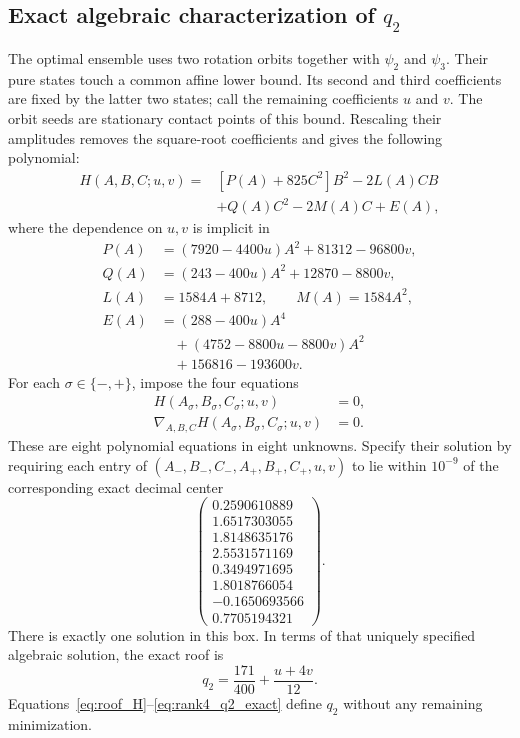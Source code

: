 \documentclass[11pt]{article}
\begin{document}
\subsection{Exact algebraic characterization of $q_2$}
The optimal ensemble uses two rotation orbits together with $\psi_2$ and $\psi_3$. Their pure states touch a common affine lower bound. Its second and third coefficients are fixed by the latter two states; call the remaining coefficients $u$ and $v$. The orbit seeds are stationary contact points of this bound. Rescaling their amplitudes removes the square-root coefficients and gives the following polynomial:
\begin{align}\label{eq:roof_H}
 H(A,B,C;u,v)={}&[P(A)+825C^2]B^2-2L(A)CB\nonumber\\
 &+Q(A)C^2-2M(A)C+E(A),
\end{align}
where the dependence on $u,v$ is implicit in
\begin{align}\label{eq:roof_q2_coefficients}
 P(A)&=(7920-4400u)A^2+81312-96800v,\nonumber\\
 Q(A)&=(243-400u)A^2+12870-8800v,\nonumber\\
 L(A)&=1584A+8712,\qquad M(A)=1584A^2,\nonumber\\
 E(A)&=(288-400u)A^4\nonumber\\
 &\quad +(4752-8800u-8800v)A^2\nonumber\\
 &\quad +156816-193600v.
\end{align}
For each $\sigma\in\{-,+\}$, impose the four equations
\begin{equation}\label{eq:roof_q2_root_system}
 \begin{aligned}
 H(A_\sigma,B_\sigma,C_\sigma;u,v)&=0,\\
 \nabla_{A,B,C}H(A_\sigma,B_\sigma,C_\sigma;u,v)&=0.
 \end{aligned}
\end{equation}
These are eight polynomial equations in eight unknowns. Specify their solution by requiring each entry of
$(A_-,B_-,C_-,A_+,B_+,C_+,u,v)$ to lie within $10^{-9}$ of the corresponding exact decimal center
\begin{equation}\label{eq:roof_q2_root_box}
 \begin{pmatrix}
 0.2590610889\\1.6517303055\\1.8148635176\\
 2.5531571169\\0.3494971695\\1.8018766054\\
 -0.1650693566\\0.7705194321
 \end{pmatrix}.
\end{equation}
There is exactly one solution in this box. In terms of that uniquely specified algebraic solution, the exact roof is
\begin{equation}\label{eq:rank4_q2_exact}
 \boxed{q_2=\frac{171}{400}+\frac{u+4v}{12}.}
\end{equation}
Equations~\eqref{eq:roof_H}--\eqref{eq:rank4_q2_exact} define $q_2$ without any remaining minimization.
\end{document}
